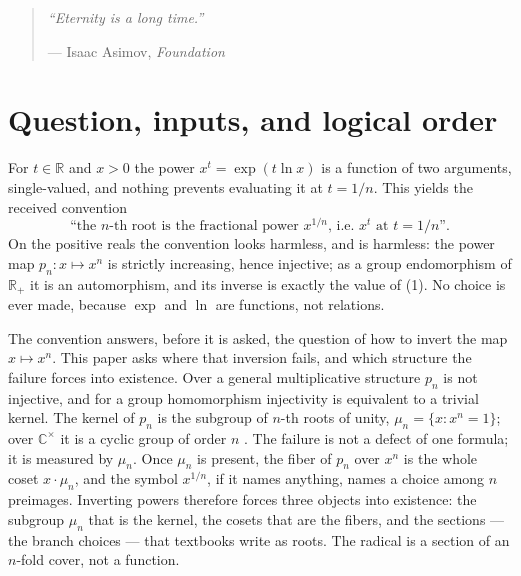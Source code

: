 \documentclass[submission,noinfoline]{jsfds}
\begin{document}
\begin{quote}
  \itshape ``Eternity is a long time.''
  \par\vspace{2pt}
  \begin{flushright}
    \small --- Isaac Asimov, \emph{Foundation}
  \end{flushright}
\end{quote}
\vspace{0.8em}

\section{Question, inputs, and logical order}\label{sec:intro}

For $t\in\mathbb R$ and $x>0$ the power $x^t=\exp(t\ln x)$
\citep{Euler1748} is a function of two arguments, single-valued, and
nothing prevents evaluating it at $t=1/n$. This yields the received
convention
\begin{equation}
  \text{``the $n$-th root is the fractional power $x^{1/n}$,
  i.e.\ $x^t$ at $t=1/n$''}.
\end{equation}
On the positive reals the convention looks harmless, and is harmless: the
power map $p_n\colon x\mapsto x^n$ is strictly increasing, hence
injective; as a group endomorphism of $\mathbb R_+$ it is an
automorphism, and its inverse is exactly the value of (1). No choice is
ever made, because $\exp$ and $\ln$ are functions, not relations.

The convention answers, before it is asked, the question of how to
invert the map $x\mapsto x^n$. This paper asks where that inversion
fails, and which structure the failure forces into existence. Over a
general multiplicative structure $p_n$ is not injective, and for a group
homomorphism injectivity is equivalent to a trivial kernel. The kernel
of $p_n$ is the subgroup of $n$-th roots of unity,
$\mu_n=\{x:x^n=1\}$; over $\mathbb C^\times$ it is a cyclic group of
order $n$ \citep{Gauss1801}. The failure is not a defect of one formula;
it is measured by $\mu_n$. Once $\mu_n$ is present, the fiber of $p_n$
over $x^n$ is the whole coset $x\cdot\mu_n$, and the symbol $x^{1/n}$,
if it names anything, names a choice among $n$ preimages. Inverting
powers therefore forces three objects into existence: the subgroup
$\mu_n$ that is the kernel, the cosets that are the fibers, and the
sections --- the branch choices --- that textbooks write as roots. The
radical is a section of an $n$-fold cover, not a function.
\end{document}
